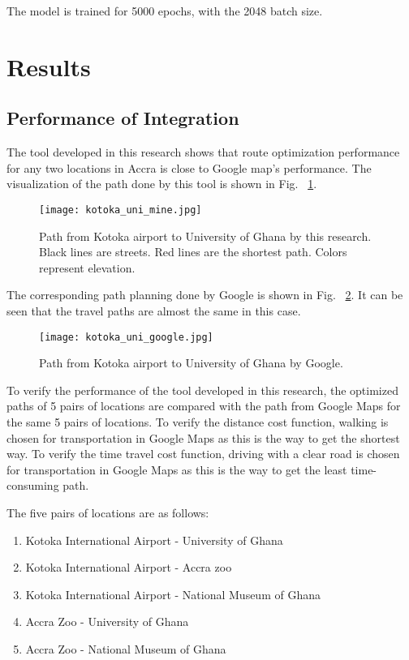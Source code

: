 \documentclass[final-report]{report-template}
\begin{document}
The model is trained for 5000 epochs, with the 2048 batch size.


\section {Results}
\subsection{Performance of Integration}
The tool developed in this research shows that route optimization performance for any two locations in Accra
is close to Google map's performance.
The visualization of the path done by this tool is shown in Fig. ~\ref{fig: mine}.

\begin{figure}[H]
    \centering
    \texttt{[image: kotoka\_uni\_mine.jpg]}
    \caption{\label{fig: mine} Path from Kotoka airport to University of Ghana by this research. Black lines are streets. Red lines are the shortest path. Colors represent elevation.}
\end{figure}
The corresponding path planning done by Google is shown in Fig. ~\ref{fig: google}. 
It can be seen that the travel paths are almost the same in this case.
\begin{figure}[H]
    \centering
    \texttt{[image: kotoka\_uni\_google.jpg]}
    \caption{\label{fig: google} Path from Kotoka airport to University of Ghana by Google.}
\end{figure}

To verify the performance of the tool developed in this research, 
the optimized paths of 5 pairs of locations are compared with the path from Google Maps for the same 5 pairs of locations.
To verify the distance cost function, walking is chosen for transportation in Google Maps as this is the way to get the shortest way.
To verify the time travel cost function, driving with a clear road is chosen for transportation in Google Maps as this is the way to get the least time-consuming path.

The five pairs of locations are as follows:
\begin{enumerate}
    \item Kotoka International Airport - University of Ghana
    \item Kotoka International Airport - Accra zoo
    \item Kotoka International Airport - National Museum of Ghana
    \item Accra Zoo - University of Ghana
    \item Accra Zoo - National Museum of Ghana
\end{enumerate}
\end{document}

